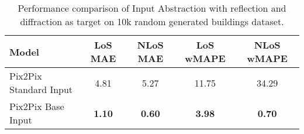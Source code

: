 		\begin{table}[h!]
			\centering
			\begin{tabular}{|l|c|c|c|c|}
				\hline
				\textbf{Model} & \textbf{LoS MAE} & \textbf{NLoS MAE} & \textbf{LoS wMAPE} & \textbf{NLoS wMAPE} \\
				\hline
				Pix2Pix Standard Input & 4.81 & 5.27 & 11.75 & 34.29 \\
				Pix2Pix Base Input & \textbf{1.10} & \textbf{0.60} & \textbf{3.98} & \textbf{0.70} \\
				\hline
			\end{tabular}
			\caption{Performance comparison of Input Abstraction with reflection and diffraction as target on 10k random generated buildings dataset.}
			\label{tab:performance_input_ref_diff}
		\end{table}
		
